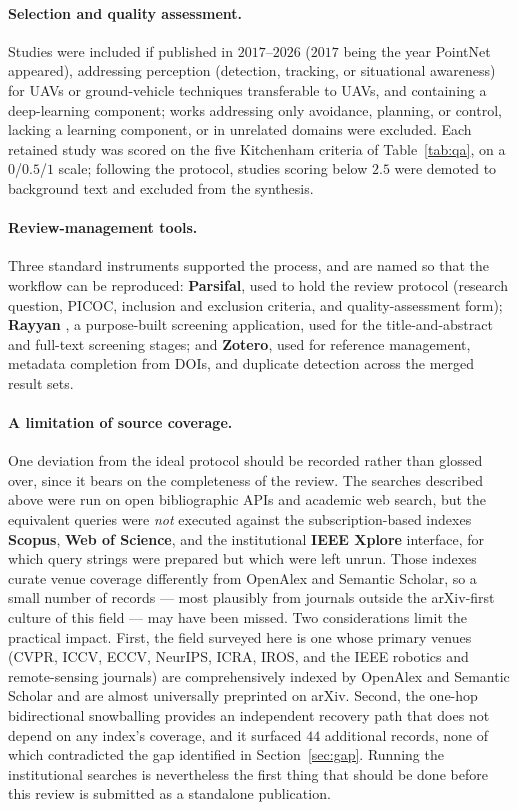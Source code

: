 \paragraph*{Selection and quality assessment.} Studies were included if published
in $2017$--$2026$ ($2017$ being the year PointNet appeared), addressing perception
(detection, tracking, or situational awareness) for UAVs or ground-vehicle
techniques transferable to UAVs, and containing a deep-learning component; works
addressing only avoidance, planning, or control, lacking a learning component, or
in unrelated domains were excluded. Each retained study was scored on the five
Kitchenham criteria of Table~\ref{tab:qa}, on a $0$/$0.5$/$1$ scale; following the
protocol, studies scoring below $2.5$ were demoted to background text and excluded
from the synthesis.

\paragraph*{Review-management tools.} Three standard instruments supported the
process, and are named so that the workflow can be reproduced:
\textbf{Parsifal}, used to hold the review protocol (research question, PICOC,
inclusion and exclusion criteria, and quality-assessment form);
\textbf{Rayyan} \cite{ouzzani2016rayyan}, a purpose-built screening application,
used for the title-and-abstract and full-text screening stages; and
\textbf{Zotero}, used for reference management, metadata completion from DOIs, and
duplicate detection across the merged result sets.

\paragraph*{A limitation of source coverage.} One deviation from the ideal
protocol should be recorded rather than glossed over, since it bears on the
completeness of the review. The searches described above were run on open
bibliographic APIs and academic web search, but the equivalent queries were
\emph{not} executed against the subscription-based indexes
\textbf{Scopus}, \textbf{Web of Science}, and the institutional
\textbf{IEEE Xplore} interface, for which query strings were prepared but which
were left unrun. Those indexes curate venue coverage differently from OpenAlex and
Semantic Scholar, so a small number of records --- most plausibly from journals
outside the arXiv-first culture of this field --- may have been missed. Two
considerations limit the practical impact. First, the field surveyed here is one
whose primary venues (CVPR, ICCV, ECCV, NeurIPS, ICRA, IROS, and the IEEE
robotics and remote-sensing journals) are comprehensively indexed by OpenAlex and
Semantic Scholar and are almost universally preprinted on arXiv. Second, the
one-hop bidirectional snowballing provides an independent recovery path that does
not depend on any index's coverage, and it surfaced $44$ additional records, none
of which contradicted the gap identified in Section~\ref{sec:gap}. Running the
institutional searches is nevertheless the first thing that should be done before
this review is submitted as a standalone publication.

